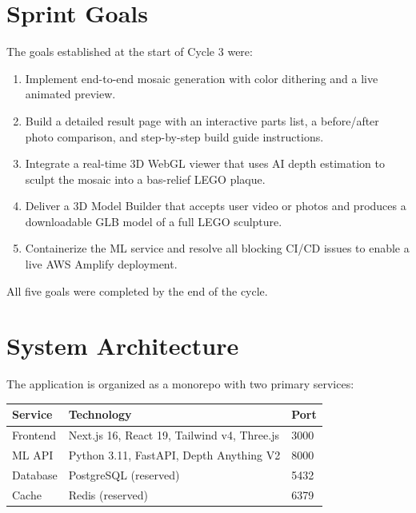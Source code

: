 \documentclass[12pt]{article}
\begin{document}
\section{Sprint Goals}

The goals established at the start of Cycle 3 were:

\begin{enumerate}[leftmargin=*]
    \item Implement end-to-end mosaic generation with color dithering and a live
          animated preview.
    \item Build a detailed result page with an interactive parts list, a
          before/after photo comparison, and step-by-step build guide
          instructions.
    \item Integrate a real-time 3D WebGL viewer that uses AI depth estimation to
          sculpt the mosaic into a bas-relief LEGO plaque.
    \item Deliver a 3D Model Builder that accepts user video or photos and
          produces a downloadable GLB model of a full LEGO sculpture.
    \item Containerize the ML service and resolve all blocking CI/CD issues to
          enable a live AWS Amplify deployment.
\end{enumerate}

All five goals were completed by the end of the cycle.

\section{System Architecture}

The application is organized as a monorepo with two primary services:

\begin{center}
\begin{tabular}{lll}
\toprule
\textbf{Service} & \textbf{Technology} & \textbf{Port} \\
\midrule
Frontend  & Next.js 16, React 19, Tailwind v4, Three.js & 3000 \\
ML API    & Python 3.11, FastAPI, Depth Anything V2      & 8000 \\
Database  & PostgreSQL (reserved)                         & 5432 \\
Cache     & Redis (reserved)                              & 6379 \\
\bottomrule
\end{tabular}
\end{center}
\end{document}
